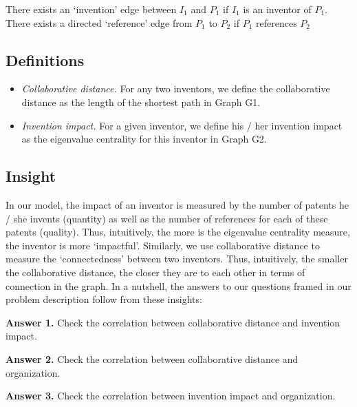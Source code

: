 \documentclass[11pt]{article}
\renewcommand{\paragraph}{\vspace{3pt}\noindent\textbf}
\newcommand{\squish}{
  \setlength{\topsep}{0pt}
  \setlength{\itemsep}{0ex}
  \setlength{\parskip}{0pt}
}
\begin{document}
There exists an `invention' edge between $I_1$ and $P_1$ if $I_1$ is an inventor of $P_1$.
There exists a directed `reference' edge from $P_1$ to $P_2$ if $P_1$ references $P_2$

\subsection{Definitions}
\begin{itemize}
\item {\em Collaborative distance.} For any two inventors, we define the collaborative distance as the length of the shortest path in Graph G1. 
\item {\em Invention impact.} For a given inventor, we define his / her invention impact as the eigenvalue centrality for this inventor in Graph G2. 
\end{itemize}

\subsection{Insight}
In our model, the impact of an inventor is measured by the number of patents he / she invents (quantity) as well as the number of references for each of these patents (quality). Thus, intuitively, the more is the eigenvalue centrality measure, the inventor is more `impactful'. Similarly, we use collaborative distance to measure the `connectedness' between two inventors. Thus, intuitively, the smaller the collaborative distance, the closer they are to each other in terms of connection in the graph. 
In a nutshell, the answers to our questions framed in our problem description follow from these insights:

\paragraph{Answer 1.} Check the correlation between collaborative distance and invention impact. 

\paragraph{Answer 2.} Check the correlation between collaborative distance and organization.

\paragraph{Answer 3.} Check the correlation between invention impact and organization.
\end{document}
